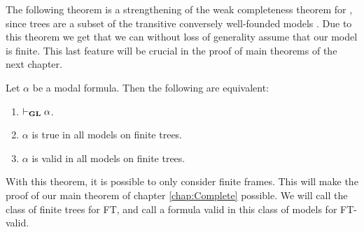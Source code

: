 \documentclass[../main.tex]{subfiles}
\begin{document}
The following theorem is a strengthening of the weak completeness theorem for
\GL, since trees are a subset of the transitive conversely well-founded models
. Due to this theorem we get that we can without loss of generality assume that
our model is finite. This last feature will be crucial in the proof of main
theorems of the next chapter.

\begin{thm}
	Let $\alpha$ be a modal formula. Then the following are equivalent:
	\begin{enumerate}
		\item $\vdash_{\text{\textbf{GL}}}\alpha$.
		\item $\alpha$ is true in all models on finite trees.
		\item $\alpha$ is valid in all models on finite trees.
	\end{enumerate}
\end{thm}
With this theorem, it is possible to only consider finite frames. This will make
the proof of our main theorem of chapter \ref{chap:Complete} possible. We will
call the class of finite trees for FT, and call a formula valid in this class
of models for FT-valid.
\end{document}
